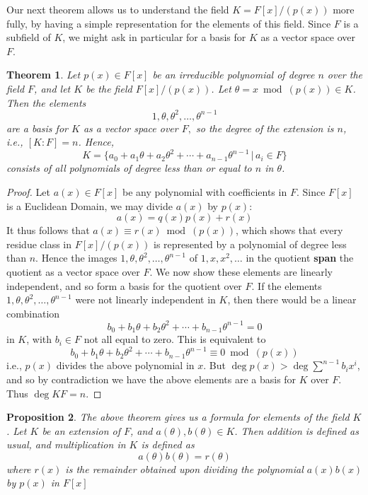 \documentclass[10pt, oneside, reqno]{amsart}
\theoremstyle{plain}%
\newtheorem{thm}{Theorem}[section]
\newtheorem{prop}[thm]{Proposition}
\theoremstyle{definition}
\theoremstyle{remark}
\newcommand{\xdeg}[2]{[#1 : #2]}
\begin{document}
Our next theorem allows us to understand the field $K = F[x]/(p(x))$ more fully, by having a simple representation for the elements of this field.  Since $F$ is a subfield of $K$, we might ask in particular for a basis for $K$ as a vector space over $F$.

\begin{thm}
	Let $p(x) \in F[x]$ be an irreducible polynomial of degree $n$ over the field $F$, and let $K$ be the field $F[x]/(p(x))$.  Let $\theta = x \bmod (p(x)) \in K$.  Then the elements \[
		1, \theta, \theta^2, \dots, \theta^{n-1}
	\]
	are a basis for $K$ as a vector space over $F,$ so the degree of the extension is $n$, i.e., $\xdeg{K}{F} = n$. Hence, \[
		K = \{ a_0 + a_1 \theta + a_2 \theta^2  + \cdots + a_{n-1} \theta^{n-1} \,| \, a_i \in F \}
	\] consists of all polynomials of degree less than or equal to $n$ in $\theta$.
\end{thm}

\begin{proof}
	Let $a(x) \in F[x]$ be any polynomial with coefficients in $F$.  Since $F[x]$ is a Euclidean Domain, we may divide $a(x)$ by $p(x)$:\[
		a(x) = q(x)p(x) + r(x)
	\] 
	It thus follows that $a(x) \equiv r(x) \bmod (p(x))$, which shows that every residue class in $F[x]/(p(x))$ is represented by a polynomial of degree less than $n$. Hence the images $1, \theta, \theta^2,\dots, \theta^{n-1}$ of $1,x,x^2,\dots$ in the quotient \textbf{span} the quotient as a vector space over $F$.   We now show these elements are linearly independent, and so form a basis for the quotient over $F$.
	If the elements $1, \theta, \theta^2, \dots, \theta^{n-1}$ were not linearly independent in $K$, then there would be a linear combination\[
		b_0 + b_1 \theta + b_2 \theta^2 + \cdots + b_{n-1} \theta^{n-1} = 0
	\] in $K$, with $b_i \in F$ not all equal to zero.  This is equivalent to \[
	b_0 + b_1 \theta + b_2 \theta^2 + \cdots + b_{n-1} \theta^{n-1} \equiv 0 \bmod (p(x))
	\] i.e., $p(x)$ divides the above polynomial in $x$.  But $\deg p(x) > \deg{\sum^{n-1} b_i x^i}$, and so by contradiction we have the above elements are a basis for $K$ over $F$.  Thus $\deg{K}{F} = n$.
\end{proof}

\begin{prop}
	The above theorem gives us a formula for elements of the field $K$.  Let $K$ be an extension of $F$, and $a(\theta), b(\theta) \in K$.  Then addition is defined as usual, and multiplication in $K$ is defined as \[
		a(\theta) b(\theta) = r(\theta)
	\]  where $r(x)$ is the remainder obtained upon dividing the polynomial $a(x) b(x)$ by $p(x)$ in $F[x]$
\end{prop}
\end{document}
